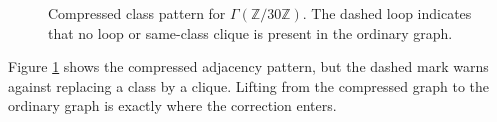 \documentclass[12pt]{article}
\theoremstyle{definition}
\begin{document}
\begin{figure}[H]
\centering
{}
\caption{Compressed class pattern for $\Gamma(\mathbb{Z}/30\mathbb{Z})$.  The dashed loop indicates that no loop or same-class clique is present in the ordinary graph.}
\label{fig:z30-compressed}
\end{figure}
Figure \ref{fig:z30-compressed} shows the compressed adjacency pattern, but the dashed mark warns against replacing a class by a clique.  Lifting from the compressed graph to the ordinary graph is exactly where the correction enters.
\end{document}
